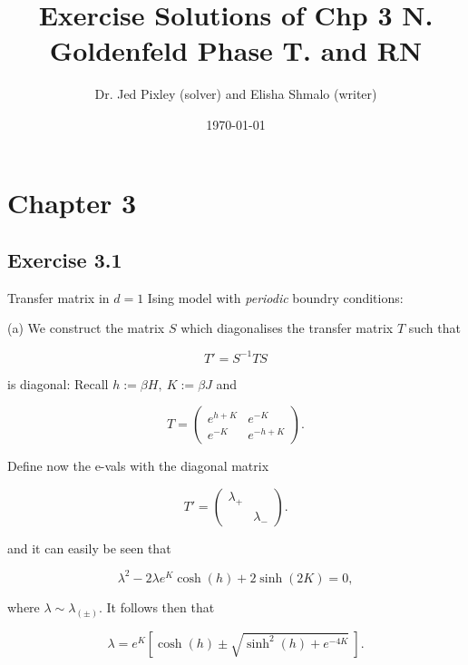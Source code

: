 \documentclass[12pt]{article}
\title{\textbf{Exercise Solutions of Chp 3 N. Goldenfeld Phase T. and RN}}
\author{Dr. Jed Pixley (solver) and Elisha Shmalo (writer)}
\date{\today}
\numberwithin{equation}{section}
\begin{document}
\maketitle

\section{Chapter 3}

\subsection{Exercise 3.1}

Transfer matrix in $d=1$ Ising model with \textit{periodic} boundry conditions:

(a) We construct the matrix $S$ which diagonalises the transfer matrix $T$ such that 

\begin{equation}
    T' = S^{-1}TS
\end{equation}

is diagonal: Recall $h := \beta H, \ K := \beta J$ and 

\begin{equation}
    T = \left(\begin{matrix}
        e^{h+K} & e^{-K} \\
        e^{-K} & e^{-h + K}
    \end{matrix}\right).
\end{equation}

Define now the e-vals with the diagonal matrix 

\begin{equation}
    T' = \left(\begin{matrix}
        \lambda_+ &  \\
         & \lambda_-
    \end{matrix}\right).
\end{equation}

and it can easily be seen that 

\begin{equation}
    \lambda^2 - 2\lambda e^K\cosh(h) + 2\sinh(2K) = 0,
\end{equation}

where $\lambda \sim \lambda_{(\pm )}$. It follows then that

\begin{equation}
    \lambda = e^K [\cosh(h) \pm \sqrt{\sinh^2(h) + e^{-4K}} \ ].
\end{equation}
\end{document}
